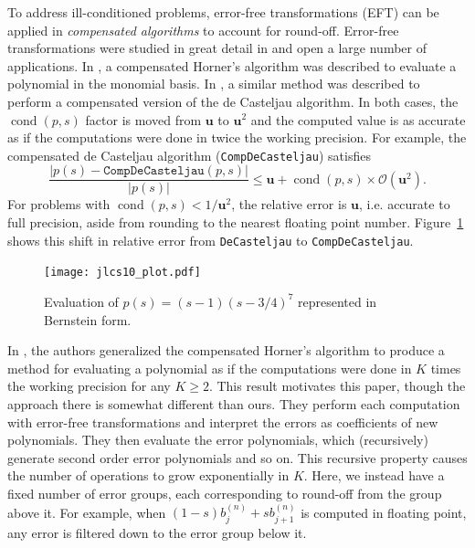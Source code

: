 \documentclass[3p, authoryear, square]{elsarticle}
\theoremstyle{definition}
\newcommand{\cond}[1]{\operatorname{cond}\left(#1\right)}
\newcommand{\bigO}[1]{\mathcal{O}\left(#1\right)}
\newcommand{\mach}{\mathbf{u}}
\begin{document}
To address ill-conditioned problems, error-free transformations (EFT) can
be applied in \textit{compensated algorithms} to account for round-off.
Error-free transformations were studied in great detail in \cite{Ogita2005}
and open a large number of applications.
In \cite{langlois_et_al:DSP:2006:442}, a compensated Horner's algorithm was
described to evaluate a polynomial in the monomial basis. In \cite{Jiang2010},
a similar method was described to perform a compensated version of the de
Casteljau algorithm. In both cases, the \(\cond{p, s}\) factor is moved
from \(\mach\) to \(\mach^2\) and the computed value is as accurate
as if the computations were done in twice the working precision. For example,
the compensated de Casteljau algorithm (\texttt{CompDeCasteljau}) satisfies
\begin{equation}\label{de-casteljau-2-error}
  \frac{\left|p(s) - \mathtt{CompDeCasteljau}(p, s)\right|}{
    \left|p(s)\right|} \leq \mach + \cond{p, s} \times
    \bigO{\mach^2}.
\end{equation}
For problems with \(\cond{p, s} < 1 / \mach^2\), the relative error
is \(\mach\), i.e. accurate to full precision, aside from rounding to the
nearest floating point number. Figure~\ref{fig:jlcs-10} shows this shift
in relative error from \texttt{DeCasteljau} to \texttt{CompDeCasteljau}.

\begin{figure}
  \texttt{[image: jlcs10\_plot.pdf]}
  \centering
  \captionsetup{width=.75\linewidth}
  \caption{Evaluation of \(p(s) = (s - 1)\left(s - 3/4\right)^7\)
    represented in Bernstein form.}
  \label{fig:jlcs-10}
\end{figure}

In \cite{Graillat2009}, the authors generalized the compensated Horner's
algorithm to produce a method for evaluating a polynomial as if
the computations were done in \(K\) times the working precision for
any \(K \geq 2\). This result motivates this paper, though the
approach there is somewhat different than ours. They perform each computation
with error-free transformations and interpret the errors as coefficients of new
polynomials. They then evaluate the error polynomials, which (recursively)
generate second order error polynomials and so on. This recursive property
causes the number of operations to grow exponentially in \(K\). Here, we
instead have a fixed number of error groups, each corresponding to round-off
from the group above it. For example, when
\((1 - s) b_j^{(n)} + s b_{j + 1}^{(n)}\) is computed in floating point, any
error is filtered down to the error group below it.
\end{document}
